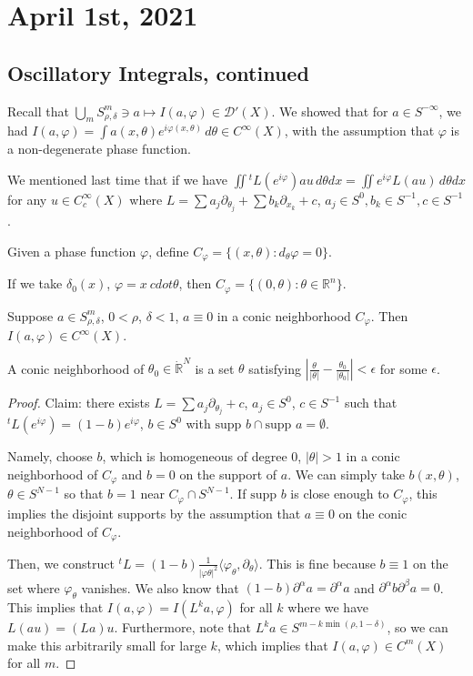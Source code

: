 \documentclass[12pt]{scrartcl}
\newcommand{\R}{\mathbb{R}}
\newcommand{\<}{\langle}
\renewcommand{\>}{\rangle}
\let \phi \varphi
\let \mc \mathcal
\newcommand{\supp}{\text{supp }}
\begin{document}
\section{April 1st, 2021}
\subsection{Oscillatory Integrals, continued}
Recall that $\bigcup_m S_{\rho, \delta}^m \ni a \mapsto I(a, \phi) \in \mc D'(X)$.  We showed that for $a \in S^{-\infty}$, we had $I(a, \phi) = \int a(x, \theta) e^{i\phi(x, \theta)}\, d\theta \in C^\infty(X)$, with the assumption that $\phi$ is a non-degenerate phase function.

We mentioned last time that if we have $\iint {}^tL(e^{i\phi}) au \,d\theta dx = \iint e^{i\phi} L(au)\,d\theta dx$ for any $u \in C_c^\infty(X)$ where $L = \sum a_j\partial_{\theta_j} + \sum b_k \partial_{x_k} + c$, $a_j \in S^0, b_k \in S^{-1}, c \in S^{-1}$.
\begin{definition}Given a phase function $\phi$, define $C_\phi = \{(x, \theta): d_\theta \phi = 0\}$.
\end{definition}
If we take $\delta_0(x)$, $\phi = x\ cdot \theta$, then $C_\phi = \{(0, \theta): \theta\in \R^n\}$.
\begin{lemma} Suppose $a \in S^{m}_{\rho, \delta}$, $0 < \rho $, $\delta < 1$, $a \equiv 0$ in a conic neighborhood $C_\phi$. Then $I(a, \phi) \in C^\infty(X)$.
\end{lemma}
\begin{definition} A conic neighborhood of $\theta_0 \in \dot{\R}^N$ is a set $\theta$ satisfying $|\frac{\theta}{|\theta|} - \frac{\theta_0}{|\theta_0|}| < \epsilon$ for some $\epsilon$.
\end{definition}
\begin{proof}
Claim: there exists $L = \sum a_j \partial_{\theta_j} + c$, $a_j \in S^0$, $c \in S^{-1}$ such that ${}^t L(e^{i\phi}) = (1 - b)e^{i\phi}$, $b \in S^0$ with $\supp{b} \cap \supp{a} =  \emptyset$.

Namely, choose $b$, which is homogeneous of degree $0$, $|\theta| > 1$ in a conic neighborhood of $C_\phi$ and $b = 0$ on the support of $a$.  We can simply take $b(x, \theta)$, $\theta \in S^{N-1}$ so that $b = 1$ near $C_\phi \cap S^{N-1}$.  If $\supp{b}$ is close enough to $C_\phi$, this implies the disjoint supports by the assumption that $a \equiv 0$ on the conic neighborhood of $C_\phi$.

Then, we construct ${}^tL = (1 - b) \frac{1}{|\phi \theta|^2} \<\phi_\theta, \partial_\theta\>$.  This is fine because $b \equiv 1$ on the set where $\phi_\theta$ vanishes.  We also know that $(1-b)\partial^\alpha a = \partial^\alpha a$ and $\partial^\alpha b \partial^\beta a = 0$.  This implies that $I(a, \phi) = I(L^k a, \phi)$ for all $k$ where we have $L(au) = (La) u$.  Furthermore, note that $L^k a \in S^{m - k\min(\rho, 1-\delta)}$, so we can make this arbitrarily small for large $k$, which implies that $I(a, \phi) \in C^m(X)$ for all $m$.


\end{proof}
\end{document}
